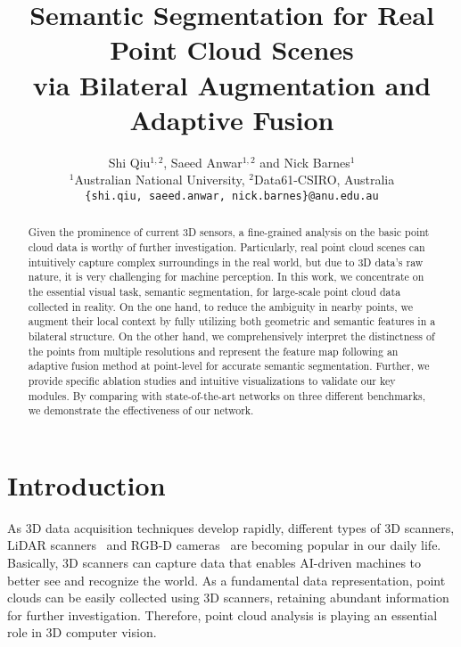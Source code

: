 \documentclass[10pt,twocolumn,letterpaper]{article}
\begin{document}
\title{Semantic Segmentation for Real Point Cloud Scenes \\via Bilateral Augmentation and Adaptive Fusion}

\author{Shi Qiu$^{1,2}$, Saeed Anwar$^{1,2}$ and Nick Barnes$^{1}$\\
$^1$Australian National University, $^2$Data61-CSIRO, Australia\\
{\tt\small \{shi.qiu, saeed.anwar, nick.barnes\}@anu.edu.au}
}

\maketitle


\begin{abstract}
Given the prominence of current 3D sensors, a fine-grained analysis on the basic point cloud data is worthy of further investigation. Particularly, real point cloud scenes can intuitively capture complex surroundings in the real world, but due to 3D data's raw nature, it is very challenging for machine perception. In this work, we concentrate on the essential visual task, semantic segmentation, for large-scale point cloud data collected in reality. On the one hand, to reduce the ambiguity in nearby points, we augment their local context by fully utilizing both geometric and semantic features in a bilateral structure. On the other hand, we comprehensively interpret the distinctness of the points from multiple resolutions and represent the feature map following an adaptive fusion method at point-level for accurate semantic segmentation. Further, we provide specific ablation studies and intuitive visualizations to validate our key modules. By comparing with state-of-the-art networks on three different benchmarks, we demonstrate the effectiveness of our network.
\end{abstract}

\section{Introduction}

As 3D data acquisition techniques develop rapidly, different types of 3D scanners, \eg LiDAR scanners~\cite{jaboyedoff2012use} and RGB-D cameras~\cite{endres20133} are becoming popular in our daily life. Basically, 3D scanners can capture data that enables AI-driven machines to better see and recognize the world. As a fundamental data representation, point clouds can be easily collected using 3D scanners, retaining abundant information for further investigation. Therefore, point cloud analysis is playing an essential role in 3D computer vision. 
\end{document}
